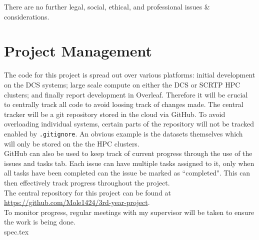 \documentclass{article}
\begin{document}
There are no further legal, social, ethical, and professional issues \& considerations.

\section{Project Management}

The code for this project is spread out over various platforms: initial development on the DCS systems; large scale compute on either the DCS or SCRTP HPC clusters; and finally report development in Overleaf. Therefore it will be crucial to centrally track all code to avoid loosing track of changes made. The central tracker will be a git repository stored in the cloud via GitHub. To avoid overloading individual systems, certain parts of the repository will not be tracked enabled by \verb|.gitignore|. An obvious example is the datasets themselves which will only be stored on the the HPC clusters.\\

GitHub can also be used to keep track of current progress through the use of the issues and tasks tab. Each issue can have multiple tasks assigned to it, only when all tasks have been completed can the issue be marked as ``completed". This can then effectively track progress throughout the project.\\

The central repository for this project can be found at \url{https://github.com/Mole1424/3rd-year-project}.\\

To monitor progress, regular meetings with my supervisor will be taken to ensure the work is being done.\\




\newpage
\appendix
{spec.tex}
\end{document}
